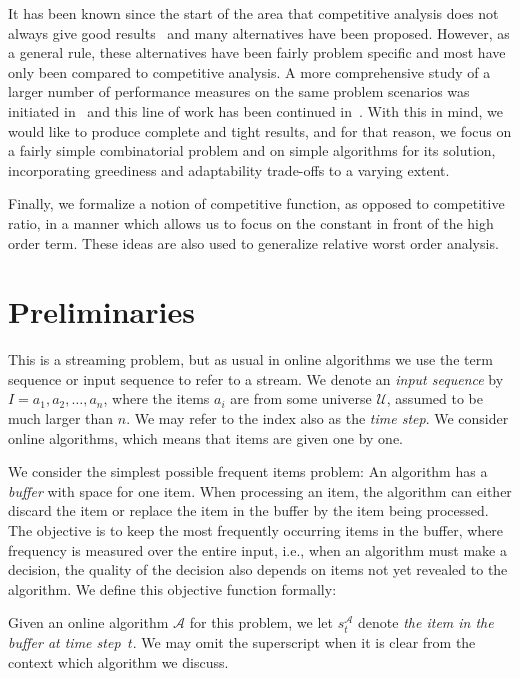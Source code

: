 \documentclass[11pt]{article}
\begin{document}
It has been known since the start of the area that competitive analysis does not
always give good results~\cite{ST85} and many alternatives have been proposed.
However, as a general rule, these alternatives have been fairly problem specific
and most have only been compared to competitive analysis.
A more comprehensive study of a larger number of performance measures
on the same problem scenarios was initiated in~\cite{BIL09p}
and this line of work has been continued in~\cite{BLM12p,BGL12p,BGLtap}.
With this in mind, we would like to produce complete and tight results,
and for that reason, we focus on a fairly simple combinatorial problem
and on simple algorithms for its solution, incorporating greediness
and adaptability trade-offs to a varying extent.

Finally, we formalize a notion of competitive function, as opposed to
competitive ratio, in a manner which allows us to focus on the constant
in front of the high order term.
These ideas are also used to generalize
relative worst order analysis.

\section{Preliminaries}\label{sec:prob}
This is a streaming problem, but as usual in online algorithms
we use the term sequence or input sequence to refer to
a stream.
We denote an \emph{input sequence} by $I = a_1, a_2,\ldots, a_n$,
where the items $a_i$ are from some universe $\mathcal{U}$,
assumed to be much larger than $n$.
We may refer to the index also as the \emph{time step}.
We consider online algorithms, which means that items are given
one by one. 


We consider the simplest possible frequent items
problem: An algorithm has a \emph{buffer} with space for one item.
When processing an item, the algorithm can either discard the item
or replace the item in the buffer by the item being processed.
The objective is to keep the most frequently occurring items in the buffer,
where frequency is measured over the entire input, i.e.,
when an algorithm must make a decision, the quality of the decision
also depends on items not yet revealed to the algorithm.
We define this objective function formally:

Given an online algorithm $\mathcal{A}$ for this problem,
we let $s^{\mathcal{A}}_t$ denote \emph{the item in the buffer at time step~$t$}.
We may omit the superscript when it is clear from the context which
algorithm we discuss.
\end{document}
